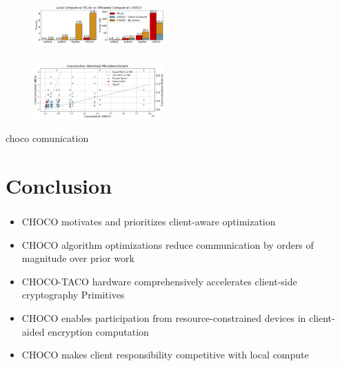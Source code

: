 \documentclass[10pt,handout]{beamer}
\begin{document}


\begin{frame}
\frametitle{}
    \begin{figure}
    \includegraphics[width=0.45\textwidth]{energy.png}
\end{figure}



\end{frame}


\begin{frame}
\frametitle{}
    \begin{figure}
    \includegraphics[width=0.45\textwidth]{comunication2.png}
\end{figure}



choco comunication
\end{frame}

\section{Conclusion}
\begin{frame}
\frametitle{}
\begin{itemize}
    \item CHOCO motivates and prioritizes client-aware optimization
    \item CHOCO algorithm optimizations reduce communication by orders of magnitude over prior work
    \item CHOCO-TACO hardware comprehensively accelerates client-side cryptography Primitives
    \item CHOCO enables participation from resource-constrained devices in client-aided encryption computation
    \item CHOCO makes client responsibility competitive with local compute
\end{itemize}

\end{frame}
\end{document}
